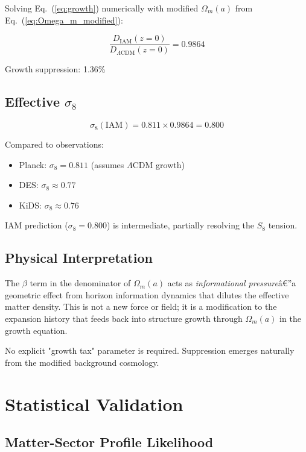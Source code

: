 \documentclass[twocolumn,superscriptaddress,prl,amsmath,amssymb]{revtex4-2}
\begin{document}
Solving Eq.~(\ref{eq:growth}) numerically with modified $\Omega_m(a)$ from Eq.~(\ref{eq:Omega_m_modified}):

\begin{equation}
\frac{D_{\text{IAM}}(z=0)}{D_{\Lambda\text{CDM}}(z=0)} = 0.9864
\end{equation}

Growth suppression: 1.36\%

\subsection{Effective $\sigma_8$}

\begin{equation}
\sigma_8(\text{IAM}) = 0.811 \times 0.9864 = 0.800
\end{equation}

Compared to observations:
\begin{itemize}
\item Planck: $\sigma_8 = 0.811$ (assumes $\Lambda$CDM growth)
\item DES: $\sigma_8 \approx 0.77$~\cite{DES2022}
\item KiDS: $\sigma_8 \approx 0.76$~\cite{KiDS2020}
\end{itemize}

IAM prediction ($\sigma_8 = 0.800$) is intermediate, partially resolving the $S_8$ tension.

\subsection{Physical Interpretation}

The $\beta$ term in the denominator of $\Omega_m(a)$ acts as \textit{informational pressure}â€”a geometric effect from horizon information dynamics that dilutes the effective matter density. This is not a new force or field; it is a modification to the expansion history that feeds back into structure growth through $\Omega_m(a)$ in the growth equation.

No explicit "growth tax" parameter is required. Suppression emerges naturally from the modified background cosmology.

\section{Statistical Validation}

\subsection{Matter-Sector Profile Likelihood}
\end{document}

